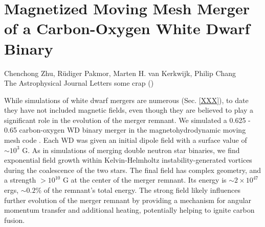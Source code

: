 \chapter{Magnetized Moving Mesh Merger of a Carbon-Oxygen White Dwarf Binary}

\begin{center}
\begin{minipage}[c]{4.75in}
Chenchong Zhu, R\"{u}diger Pakmor, Marten H. van Kerkwijk, Philip Chang\\
The Astrophysical Journal Letters {\charles some crap} (\citeal{zhu+15})
\vspace{2em}
\end{minipage}
\end{center}

While simulations of white dwarf mergers are numerous (Sec. \ref{XXX}), to date they have not included magnetic fields, even though they are believed to play a significant role in the evolution of the merger remnant.  We simulated a 0.625 - 0.65 {\Msun} carbon-oxygen WD binary merger in the magnetohydrodynamic moving mesh code {\arepo}.  Each WD was given an initial dipole field with a surface value of $\sim10^3$ G.  As in simulations of merging double neutron star binaries, we find exponential field growth within Kelvin-Helmholtz instability-generated vortices during the coalescence of the two stars.  The final field has complex geometry, and a strength $>10^{10}$ G at the center of the merger remnant.  Its energy is $\sim2\times10^{47}$ ergs, $\sim0.2$\% of the remnant's total energy.  The strong field likely influences further evolution of the merger remnant by providing a mechanism for angular momentum transfer and additional heating, potentially helping to ignite carbon fusion.
